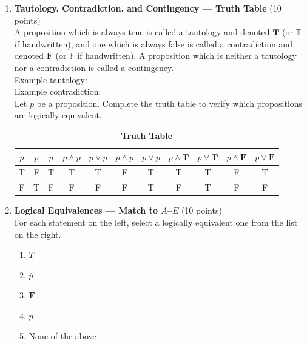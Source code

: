 \begin{enumerate}
  \item \textbf{Tautology, Contradiction, and Contingency --- Truth Table} (10 points)\\
  A proposition which is always true is called a tautology and denoted $\boldsymbol{T}$ (or $\mathbb{T}$ if handwritten), and one which is always false is called a contradiction and denoted $\boldsymbol{F}$ (or $\mathbb{F}$ if handwritten). A proposition which is neither a tautology nor a contradiction is called a contingency.\\
  Example tautology: \\
  Example contradiction: \\
  Let $p$ be a proposition. Complete the truth table to verify which propositions are logically equivalent.
  \begin{table}[h!]
  \centering
  \renewcommand{\arraystretch}{1.3}
  \setlength{\tabcolsep}{8pt}
  \caption*{\textbf{Truth Table}}
  \begin{tabular}{|c|c|c|c|c|c|c|c|c|c|c|}
  \hline
  \rowcolor[HTML]{E0E0E0}
  $p$ & $\bar{p}$ & $\overline{\bar{p}}$ & $p \wedge p$ & $p \vee p$ & $p \wedge \bar{p}$ & $p \vee \bar{p}$ & $p \wedge \boldsymbol{T}$ & $p \vee \boldsymbol{T}$ & $p \wedge \boldsymbol{F}$ & $p \vee \boldsymbol{F}$ \\
  \hline
  T & F & T & T & T & F & T & T & T & F & T \\
  \hline
  F & T & F & F & F & F & T & F & T & F & F \\
  \hline
  \end{tabular}
  \end{table}

  \newpage

  \item \textbf{Logical Equivalences --- Match to $A$--$E$} (10 points)\\
  For each statement on the left, select a logically equivalent one from the list on the right.
  \begin{enumerate}[label=(\Alph*)]
    \item $T$
    \item $\bar{p}$
    \item $\boldsymbol{F}$
    \item $p$
    \item None of the above
  \end{enumerate}


\end{enumerate}
